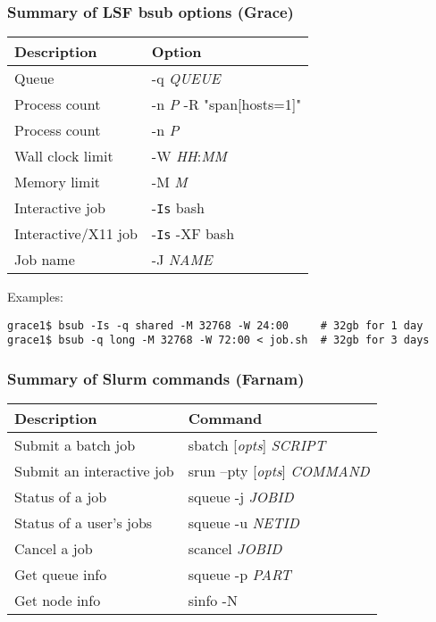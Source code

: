 \documentclass[10pt]{beamer}
\begin{document}
\begin{frame}[fragile]
\frametitle{Summary of LSF bsub options (Grace)}
\begin{tabular}{|l|l|}
\hline
\textbf{Description} & \textbf{Option} \\
\hline
Queue & -q \textit{QUEUE} \\
\hline
Process count & -n \textit{P} -R "span[hosts=1]" \\
\hline
Process count & -n \textit{P} \\
\hline
Wall clock limit & -W \textit{HH}:\textit{MM} \\
\hline
Memory limit & -M \textit{M} \\
\hline
Interactive job & -\texttt{Is} bash \\
\hline
Interactive/X11 job & -\texttt{Is} -XF bash \\
\hline
Job name & -J \textit{NAME} \\
\hline
\end{tabular}

\vskip10pt
Examples:
\begin{verbatim}
grace1$ bsub -Is -q shared -M 32768 -W 24:00     # 32gb for 1 day
grace1$ bsub -q long -M 32768 -W 72:00 < job.sh  # 32gb for 3 days
\end{verbatim}
\end{frame}

\begin{frame}
\frametitle{Summary of Slurm commands (Farnam)}
\begin{tabular}{|l|l|}
\hline
\textbf{Description} & \textbf{Command} \\
\hline
Submit a batch job & sbatch [\textit{opts}] \textit{SCRIPT} \\
\hline
Submit an interactive job & srun --pty [\textit{opts}] \textit{COMMAND} \\
\hline
Status of a job & squeue -j \textit{JOBID} \\
\hline
Status of a user's jobs & squeue -u \textit{NETID} \\
\hline
Cancel a job & scancel \textit{JOBID} \\
\hline
Get queue info & squeue -p \textit{PART} \\
\hline
Get node info & sinfo -N \\
\hline
\end{tabular}
\end{frame}
\end{document}
